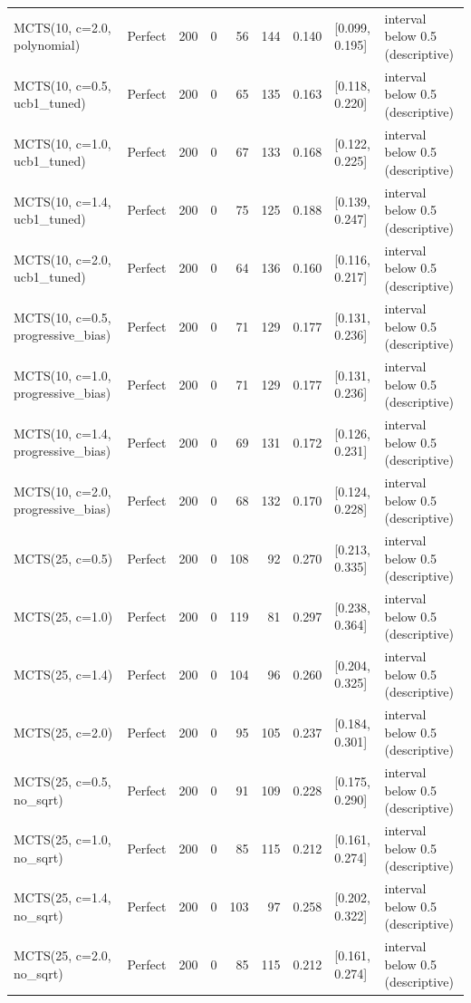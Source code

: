 \begin{table}[!t]
\begin{tabular}{llrrrrrll}
MCTS(10, c=2.0, polynomial) & Perfect & 200 & 0 & 56 & 144 & 0.140 & [0.099, 0.195] & interval below 0.5 (descriptive) \\
MCTS(10, c=0.5, ucb1\_tuned) & Perfect & 200 & 0 & 65 & 135 & 0.163 & [0.118, 0.220] & interval below 0.5 (descriptive) \\
MCTS(10, c=1.0, ucb1\_tuned) & Perfect & 200 & 0 & 67 & 133 & 0.168 & [0.122, 0.225] & interval below 0.5 (descriptive) \\
MCTS(10, c=1.4, ucb1\_tuned) & Perfect & 200 & 0 & 75 & 125 & 0.188 & [0.139, 0.247] & interval below 0.5 (descriptive) \\
MCTS(10, c=2.0, ucb1\_tuned) & Perfect & 200 & 0 & 64 & 136 & 0.160 & [0.116, 0.217] & interval below 0.5 (descriptive) \\
MCTS(10, c=0.5, progressive\_bias) & Perfect & 200 & 0 & 71 & 129 & 0.177 & [0.131, 0.236] & interval below 0.5 (descriptive) \\
MCTS(10, c=1.0, progressive\_bias) & Perfect & 200 & 0 & 71 & 129 & 0.177 & [0.131, 0.236] & interval below 0.5 (descriptive) \\
MCTS(10, c=1.4, progressive\_bias) & Perfect & 200 & 0 & 69 & 131 & 0.172 & [0.126, 0.231] & interval below 0.5 (descriptive) \\
MCTS(10, c=2.0, progressive\_bias) & Perfect & 200 & 0 & 68 & 132 & 0.170 & [0.124, 0.228] & interval below 0.5 (descriptive) \\
MCTS(25, c=0.5) & Perfect & 200 & 0 & 108 & 92 & 0.270 & [0.213, 0.335] & interval below 0.5 (descriptive) \\
MCTS(25, c=1.0) & Perfect & 200 & 0 & 119 & 81 & 0.297 & [0.238, 0.364] & interval below 0.5 (descriptive) \\
MCTS(25, c=1.4) & Perfect & 200 & 0 & 104 & 96 & 0.260 & [0.204, 0.325] & interval below 0.5 (descriptive) \\
MCTS(25, c=2.0) & Perfect & 200 & 0 & 95 & 105 & 0.237 & [0.184, 0.301] & interval below 0.5 (descriptive) \\
MCTS(25, c=0.5, no\_sqrt) & Perfect & 200 & 0 & 91 & 109 & 0.228 & [0.175, 0.290] & interval below 0.5 (descriptive) \\
MCTS(25, c=1.0, no\_sqrt) & Perfect & 200 & 0 & 85 & 115 & 0.212 & [0.161, 0.274] & interval below 0.5 (descriptive) \\
MCTS(25, c=1.4, no\_sqrt) & Perfect & 200 & 0 & 103 & 97 & 0.258 & [0.202, 0.322] & interval below 0.5 (descriptive) \\
MCTS(25, c=2.0, no\_sqrt) & Perfect & 200 & 0 & 85 & 115 & 0.212 & [0.161, 0.274] & interval below 0.5 (descriptive) \\

\end{tabular}
\end{table}
